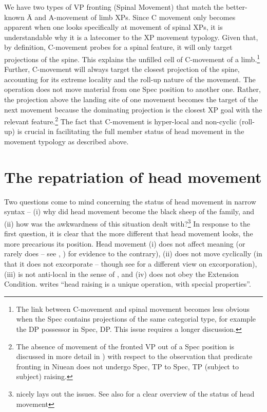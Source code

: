 \documentclass[output=paper,colorlinks,citecolor=brown,
]{langscibook}
\begin{document}
We have two types of VP fronting (Spinal Movement) that match the better-known \=A and A-movement of limb XPs.  Since C movement only becomes apparent when one looks specifically at movement of spinal XPs, it is understandable why it is a latecomer to the XP movement typology.  Given that, by definition, C-movement probes for a spinal feature, it will only target projections of the spine.  This explains the unfilled cell of C-movement of a limb.\footnote{The link between C-movement and spinal movement becomes less obvious when the Spec contains projections of the same categorial type, for example the DP possessor in Spec, DP. This issue requires a longer discussion.}    Further, C-movement will always target the closest projection of the spine, accounting for its extreme locality and the roll-up nature of the movement. The operation does not move material from one Spec position to another one. Rather, the projection above the landing site of one movement becomes the target of the next movement because the dominating projection is the closest XP goal with the relevant feature.\footnote{The absence of movement of the fronted VP out of a Spec position is discussed in more detail in \citet{Travis:2021}) with respect to the observation that predicate fronting in Niuean does not undergo Spec, TP to Spec, TP (subject to subject) raising.}   The fact that C-movement is hyper-local and non-cyclic (roll-up) is crucial in facilitating the full member status of head movement in the movement typology as described above.  

\section{The repatriation of head movement}

Two questions come to mind concerning the status of head movement in narrow syntax -- (i) why did head movement become the black sheep of the family, and (ii) how was the awkwardness of this situation dealt with?\footnote{\citet{Roberts:2010} nicely lays out the issues. See also \citet{Dekany:2018} for a clear overview of the status of head movement}   In response to the first question, it is clear that the more different that head movement looks, the more precarious its position.  Head movement (i) does not affect meaning (or rarely does -- see \citet{Lechner:2006}, \citealt[Ch. 1]{Roberts:2010}) for evidence to the contrary), (ii) does not move cyclically (in that it does not excorporate -- though see \citet{Roberts:2010} for a different view on excorporation), (iii) is not anti-local in the sense of \citet{Grohmann:2003b}, and (iv)  does not obey the Extension Condition.  \citet[12]{Chomsky:2015} writes “head raising is a unique operation, with special properties”. 
\end{document}

